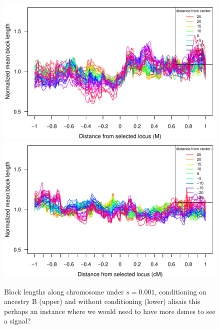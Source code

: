 \begin{figure}
    \includegraphics{figs/s001_adjacentBlocksAlongChromAncBConditioning}
    \includegraphics{figs/s001_adjacentBlocksAlongChromNoConditioningHighRes}
        \caption{
     Block lengths along chromosome under $s=0.001$, conditioning on ancestry B (upper) and without conditioning (lower) alisa{is this perhaps an instance where we would need to have more demes to see a signal?
    }
    } \label{sfig:blockLengthPlot_t1000_s0.001}
\end{figure}




% 
